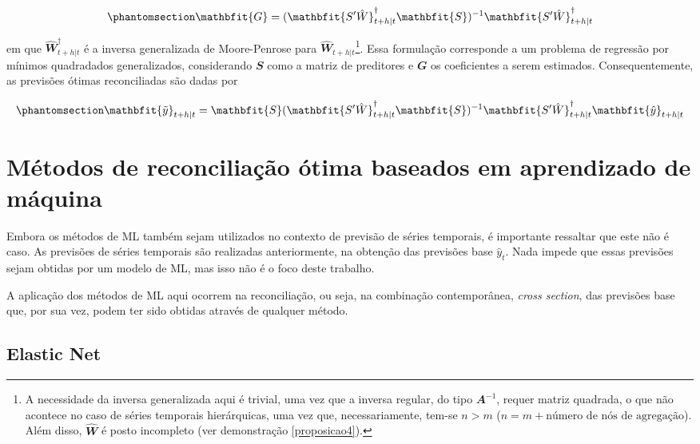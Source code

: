 \begin{apendicesenv}
\begin{equation}\phantomsection\label{eq-mint3}{
\mathbfit{G} = (\mathbfit{S'\hat{W}}^\dagger_{t+h|t}\mathbfit{S})^{-1}\mathbfit{S'\hat{W}}^\dagger_{t+h|t}
}\end{equation}

\noindent em que \(\mathbfit{\hat{W}}^\dagger_{t+h|t}\) é a inversa
generalizada de Moore-Penrose para
\(\mathbfit{\hat{W}}_{t+h|t}\)\footnote{A necessidade da inversa
  generalizada aqui é trivial, uma vez que a inversa regular, do tipo
  \(\mathbfit{A}^{-1}\), requer matriz quadrada, o que não acontece no
  caso de séries temporais hierárquicas, uma vez que, necessariamente,
  tem-se \(n>m\) (\(n=m+\text{número de nós de agregação}\)). Além
  disso, \(\mathbfit{\hat{W}}\) é posto incompleto (ver demonstração
  \ref{proposicao4}).}. Essa formulação corresponde a um problema de
regressão por mínimos quadradados generalizados, considerando
\(\mathbfit{S}\) como a matriz de preditores e \(\mathbfit{G}\) os
coeficientes a serem estimados. Consequentemente, as previsões ótimas
reconciliadas são dadas por

\begin{equation}\phantomsection\label{eq-mint4}{
\mathbfit{\tilde{y}}_{t+h|t} = \mathbfit{S}(\mathbfit{S'\hat{W}}^\dagger_{t+h|t}\mathbfit{S})^{-1}\mathbfit{S'\hat{W}}^\dagger_{t+h|t}\mathbfit{\hat{y}}_{t+h|t}
}\end{equation}

\section{Métodos de reconciliação ótima baseados em aprendizado de
máquina}\label{muxe9todos-de-reconciliauxe7uxe3o-uxf3tima-baseados-em-aprendizado-de-muxe1quina}

Embora os métodos de ML também sejam utilizados no contexto de previsão
de séries temporais, é importante ressaltar que este não é caso. As
previsões de séries temporais são realizadas anteriormente, na obtenção
das previsões base \(\hat{y}_t\). Nada impede que essas previsões sejam
obtidas por um modelo de ML, mas isso não é o foco deste trabalho.

A aplicação dos métodos de ML aqui ocorrem na reconciliação, ou seja, na
combinação contemporânea, \emph{cross section}, das previsões base que,
por sua vez, podem ter sido obtidas através de qualquer método.

\subsection{Elastic Net}\label{elastic-net}


\end{apendicesenv}
